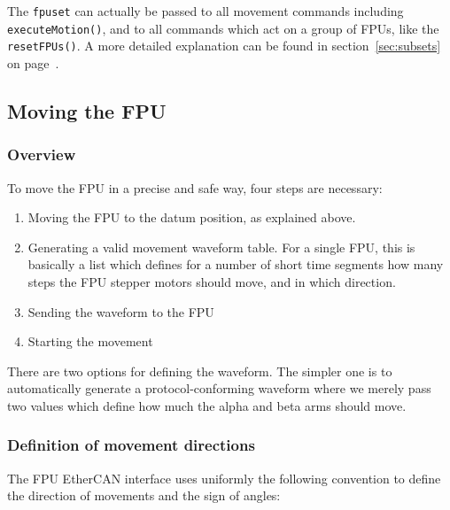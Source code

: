 \documentclass[11pt,a4paper]{scrartcl}
\begin{document}
The \texttt{fpuset} can actually be passed to all movement commands
including \texttt{executeMotion()}, and to all commands which act on a
group of FPUs, like the \texttt{resetFPUs()}. A more detailed
explanation can be found in section~\ref{sec:subsets} on
page~\pageref{sec:subsets}.


\subsection{Moving the FPU}
\subsubsection{Overview}
To move the FPU in a precise and safe way, four steps are necessary:

\begin{enumerate}
\item Moving the FPU to the datum position, as explained above.

\item Generating a valid movement waveform table. For a single FPU,
  this is basically a list which defines for a number of short time
  segments how many steps the FPU stepper motors should move, and in
  which direction.

\item Sending the waveform to the FPU
\item Starting the movement
  
\end{enumerate}

There are two options for defining the waveform. The simpler one is to
automatically generate a protocol-conforming waveform where we merely
pass two values which define how much the alpha and beta arms should
move.

\subsubsection{Definition of movement directions}

The FPU EtherCAN interface uses uniformly the following convention
to define the direction of movements and the sign of
angles:
\end{document}
